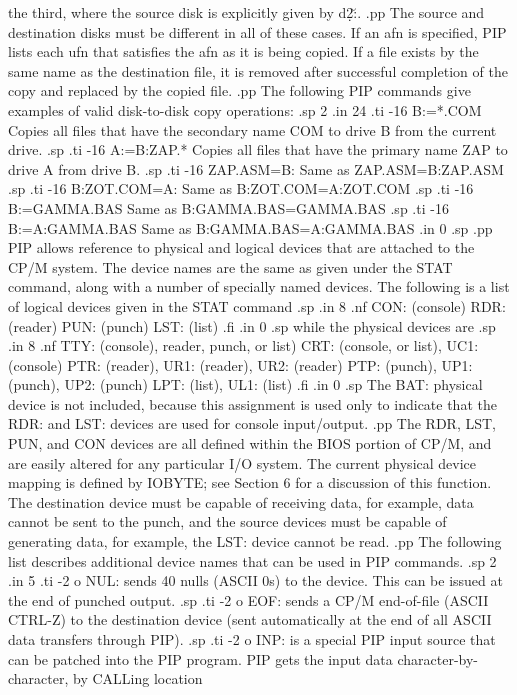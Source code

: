 the third, where the source disk is explicitly given by d\d2\u:.
.pp
The source and destination disks must be different in all of these cases.
If an afn is specified, PIP lists each ufn that satisfies the afn as it
is being copied.  If a file exists by the same name as the destination file,
it is removed after successful completion of the copy and replaced by the
copied file.
.pp
The following PIP commands give examples of valid disk-to-disk copy operations:
.sp 2
.in 24
.ti -16
B:=*.COM        Copies all files that have the secondary name COM to
drive B from the current drive.
.sp
.ti -16
A:=B:ZAP.*      Copies all files that have the primary name ZAP to
drive A from drive B.
.sp
.ti -16
ZAP.ASM=B:      Same as ZAP.ASM=B:ZAP.ASM
.sp
.ti -16
B:ZOT.COM=A:    Same as B:ZOT.COM=A:ZOT.COM
.sp
.ti -16
B:=GAMMA.BAS    Same as B:GAMMA.BAS=GAMMA.BAS
.sp
.ti -16
B:=A:GAMMA.BAS  Same as B:GAMMA.BAS=A:GAMMA.BAS
.in 0
.sp
.pp
PIP allows reference to physical and logical devices that are attached to the
CP/M system.  The device names are the same as given under the STAT command,
along with a number of specially named devices.  The following is 
a list of logical devices given in the STAT command
.sp
.in 8
.nf
CON: (console)
RDR: (reader)
PUN: (punch)
LST: (list)
.fi
.in 0
.sp
while the physical devices are
.sp
.in 8
.nf
TTY: (console), reader, punch, or list)
CRT: (console, or list), UC1: (console)
PTR: (reader), UR1: (reader), UR2: (reader)
PTP: (punch), UP1: (punch), UP2: (punch)
LPT: (list), UL1: (list)
.fi
.in 0
.sp
The BAT: physical device is not included, because this assignment is used
only to indicate that the RDR: and LST: devices are used for console
input/output.
.pp
The RDR, LST, PUN, and CON devices are all defined within the BIOS portion of
CP/M, and are easily altered for any particular I/O system.  The current
physical device mapping is defined by IOBYTE; see Section 6 for a discussion
of this function.  The destination device must be capable of 
receiving data, for example, data cannot be sent to the punch, and the
source devices must be
capable of generating data, for example, the LST: device cannot be read.
.pp
The following list describes additional device names that can be used in
PIP commands.
.sp 2
.in 5
.ti -2
o NUL: sends 40 nulls (ASCII 0s) to the device.  This can be issued
at the end of punched output.
.sp
.ti -2
o EOF: sends a CP/M end-of-file (ASCII CTRL-Z) to the destination
device (sent automatically at the end of all ASCII data transfers through PIP).
.sp
.ti -2
o INP: is a special PIP input source that can be patched into the PIP
program.  PIP gets the input data character-by-character, by CALLing location
